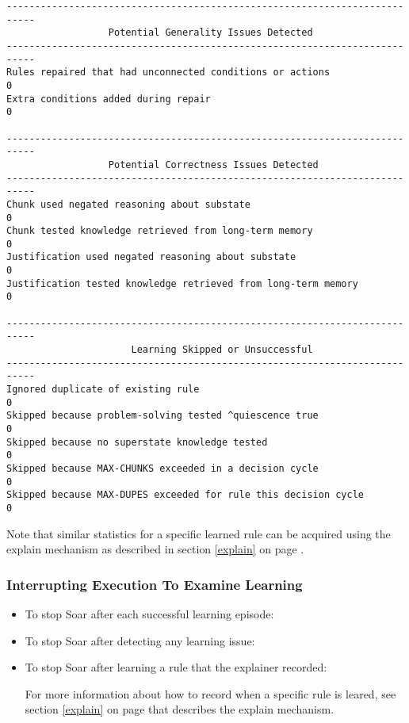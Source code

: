 \begin{center}
{\begin{verbatim}
---------------------------------------------------------------------------
                  Potential Generality Issues Detected
---------------------------------------------------------------------------
Rules repaired that had unconnected conditions or actions              0
Extra conditions added during repair                                   0

---------------------------------------------------------------------------
                  Potential Correctness Issues Detected
---------------------------------------------------------------------------
Chunk used negated reasoning about substate                            0
Chunk tested knowledge retrieved from long-term memory                 0
Justification used negated reasoning about substate                    0
Justification tested knowledge retrieved from long-term memory         0

---------------------------------------------------------------------------
                      Learning Skipped or Unsuccessful
---------------------------------------------------------------------------
Ignored duplicate of existing rule                                     0
Skipped because problem-solving tested ^quiescence true                0
Skipped because no superstate knowledge tested                         0
Skipped because MAX-CHUNKS exceeded in a decision cycle                0
Skipped because MAX-DUPES exceeded for rule this decision cycle        0
\end{verbatim}
}
\end{center}

Note that similar statistics for a specific learned rule can be acquired using the explain mechanism as described in section \ref{explain} on page \pageref{explain}.

\subsubsection{Interrupting Execution To Examine Learning}

\begin{itemize}
	\item To stop Soar after each successful learning episode: \newline {}
	\item To stop Soar after detecting any learning issue: \newline {}
	\item To stop Soar after learning a rule that the explainer recorded: \newline {}

For more information about how to record when a specific rule is leared, see section \ref{explain} on page \pageref{explain} that describes the explain mechanism.

\end{itemize}


